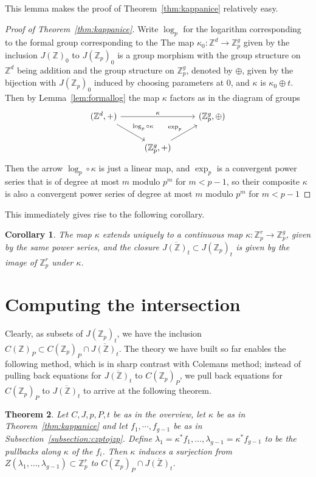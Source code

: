 \documentclass[12pt]{article}
\newcommand{\Z}{\mathbb{Z}}
\theoremstyle{plain}
\newtheorem{thm}{Theorem}[section] %
\newtheorem{cor}[thm]{Corollary} %
\theoremstyle{definition}
\theoremstyle{remark}
\begin{document}
This lemma makes the proof of Theorem~\ref{thm:kappanice} relatively easy. 
\begin{proof}[Proof of Theorem~\ref{thm:kappanice}]
Write $\log_p$ for the logarithm corresponding to the formal group corresponding to the The map $\kappa_0: \Z^d \to \Z_p^g$ given by the inclusion $J(\Z)_0$ to $J(\Z_p)_0$ is a group morphism with the group structure on $\Z^d$ being addition and the group structure on $\Z_p^g$, denoted by $\oplus$, given by the bijection with $J(\Z_p)_0$ induced by choosing parameters at $0$, and $\kappa$ is $\kappa_0 \oplus t$. Then by Lemma~\ref{lem:formallog} the map $\kappa$ factors as in the diagram of groups
\[
\begin{tikzcd}
{(\Z^d,+)} \arrow[rr, "\kappa"] \arrow[rd, "\log_p \circ \kappa"] &                                   & {(\Z_p^g,\oplus)} \\
                                                                  & {(\Z_p^g,+)} \arrow[ru, "\exp_p"] &                  
\end{tikzcd}
\]
Then the arrow $\log_p \circ \kappa$ is just a linear map, and $\exp_p$ is a convergent power series that is of degree at most $m$ modulo $p^m$ for $m < p-1$, so their composite $\kappa$ is also a convergent power series of degree at most $m$ modulo $p^m$ for $m < p-1$
\end{proof}

This immediately gives rise to the following corollary.
\begin{cor}
\label{cor:closurejac}
The map $\kappa$ extends uniquely to a continuous map $\kappa: \Z_p^r \to \Z_p^g$, given by the same power series, and the closure $\overline{J(\Z)_t} \subset J(\Z_p)_t$ is given by the image of $\Z_p^r$ under $\kappa$.
\end{cor}

\section{Computing the intersection}
\label{section:intersection}
Clearly, as subsets of $J(\Z_p)_t$, we have the inclusion $C(\Z)_P \subset C(\Z_p)_P \cap \overline{J(\Z)_t}$. The theory we have built so far enables the following method, which is in sharp contrast with Colemans method; instead of pulling back equations for $\overline{J(\Z)_t}$ to $C(\Z_p)_P$, we pull back equations for $C(\Z_p)_P$ to $\overline{J(\Z)_t}$ to arrive at the following theorem.
\begin{thm}
\label{thm:final}
Let $C,J,p,P,t$ be as in the overview, let $\kappa$ be as in Theorem~\ref{thm:kappanice} and let $f_1,\cdots,f_{g-1}$ be as in Subsection~\ref{subsection:czptojzp}. Define $\lambda_1 = \kappa^*f_1,\dots,\lambda_{g-1} = \kappa^*f_{g-1}$ to be the pullbacks along $\kappa$ of the $f_i$. Then $\kappa$ induces a surjection from $Z(\lambda_1,\dots,\lambda_{g-1}) \subset \Z_p^r$ to $C(\Z_p)_P \cap \overline{J(\Z)_t}$.
\end{thm}
\end{document}
